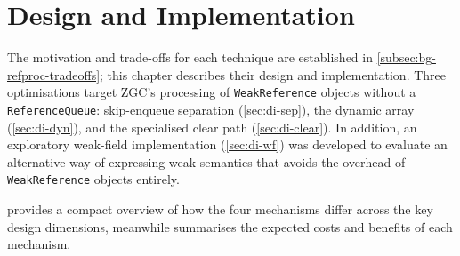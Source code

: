 \chapter{Design and Implementation}
\label{chap:design-and-implementation}

The motivation and trade-offs for each technique are established in \cref{subsec:bg-refproc-tradeoffs}; this chapter describes their design and implementation. Three optimisations target \ac{ZGC}'s processing of \texttt{WeakReference} objects without a \texttt{ReferenceQueue}: skip-enqueue separation (\cref{sec:di-sep}), the dynamic array (\cref{sec:di-dyn}), and the specialised clear path (\cref{sec:di-clear}). In addition, an exploratory weak-field implementation (\cref{sec:di-wf}) was developed to evaluate an alternative way of expressing weak semantics that avoids the overhead of \texttt{WeakReference} objects entirely.

 provides a compact overview of how the four mechanisms differ across the key design dimensions, meanwhile  summarises the expected costs and benefits of each mechanism.

